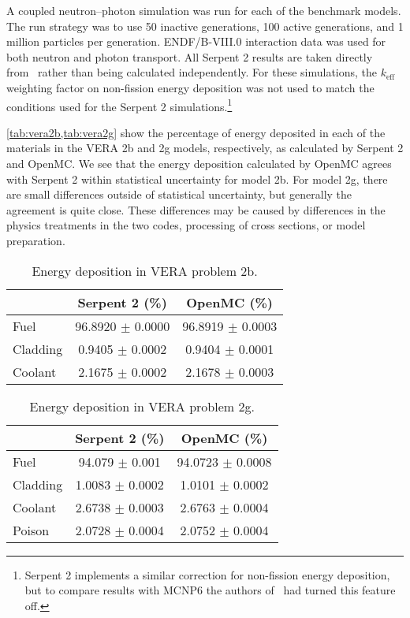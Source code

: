 \documentclass{anstrans}
\begin{document}
A coupled neutron--photon simulation was run for each of the benchmark models.
The run strategy was to use 50 inactive generations, 100 active generations, and
1 million particles per generation. ENDF/B-VIII.0 interaction data was used for
both neutron and photon transport. All Serpent 2 results are taken directly
from~\cite{tuominen2019ane} rather than being calculated independently. For
these simulations, the $k_\text{eff}$ weighting factor on non-fission energy
deposition was not used to match the conditions used for the Serpent 2
simulations.\!\footnote{Serpent 2 implements a similar correction for
non-fission energy deposition, but to compare results with MCNP6 the authors
of~\cite{tuominen2019ane} had turned this feature off.}

\cref{tab:vera2b,tab:vera2g} show the percentage of energy deposited in each of
the materials in the VERA 2b and 2g models, respectively, as calculated by
Serpent 2 and OpenMC. We see that the energy deposition calculated by OpenMC
agrees with Serpent 2 within statistical uncertainty for model 2b. For model 2g,
there are small differences outside of statistical uncertainty, but generally
the agreement is quite close. These differences may be caused by differences in
the physics treatments in the two codes, processing of cross sections, or model
preparation.
\begin{table}[htbp]
  \centering
  \caption{Energy deposition in VERA problem 2b.}
  \label{tab:vera2b}
  \begin{tabular}{lcc}
    \toprule
    & Serpent 2 (\%) & OpenMC (\%) \\
    \midrule
    Fuel & 96.8920 $\pm$ 0.0000 & 96.8919 $\pm$ 0.0003 \\
    Cladding & 0.9405 $\pm$ 0.0002 & 0.9404 $\pm$ 0.0001 \\
    Coolant & 2.1675 $\pm$ 0.0002 & 2.1678 $\pm$ 0.0003 \\
    \bottomrule
  \end{tabular}
\end{table}

\begin{table}[htbp]
  \centering
  \caption{Energy deposition in VERA problem 2g.}
  \label{tab:vera2g}
  \begin{tabular}{lcc}
    \toprule
    & Serpent 2 (\%) & OpenMC (\%) \\
    \midrule
    Fuel & 94.079 $\pm$ 0.001 & 94.0723 $\pm$ 0.0008 \\
    Cladding & 1.0083 $\pm$ 0.0002 & 1.0101 $\pm$ 0.0002 \\
    Coolant & 2.6738 $\pm$ 0.0003 & 2.6763 $\pm$ 0.0004 \\
    Poison & 2.0728 $\pm$ 0.0004 & 2.0752 $\pm$ 0.0004 \\
    \bottomrule
  \end{tabular}
\end{table}
\end{document}

